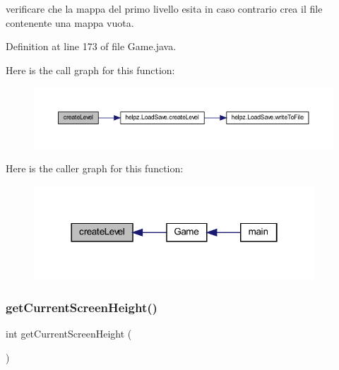 verificare che la mappa del primo livello esita in caso contrario crea il file contenente una mappa vuota. 



Definition at line 173 of file Game.\+java.

Here is the call graph for this function\+:
\nopagebreak
\begin{figure}[H]
\begin{center}
\leavevmode
\includegraphics[width=350pt]{classprogetto_1_1_game_ad79f312dd3a9e52f38a9e5f1536537fd_cgraph}
\end{center}
\end{figure}
Here is the caller graph for this function\+:\nopagebreak
\begin{figure}[H]
\begin{center}
\leavevmode
\includegraphics[width=298pt]{classprogetto_1_1_game_ad79f312dd3a9e52f38a9e5f1536537fd_icgraph}
\end{center}
\end{figure}
\mbox{\label{classprogetto_1_1_game_a08d0108e179608c5b692376d7af26351}} 
\subsubsection{\texorpdfstring{get\+Current\+Screen\+Height()}{getCurrentScreenHeight()}}
{\footnotesize\ttfamily int get\+Current\+Screen\+Height (\begin{DoxyParamCaption}{ }\end{DoxyParamCaption})}



